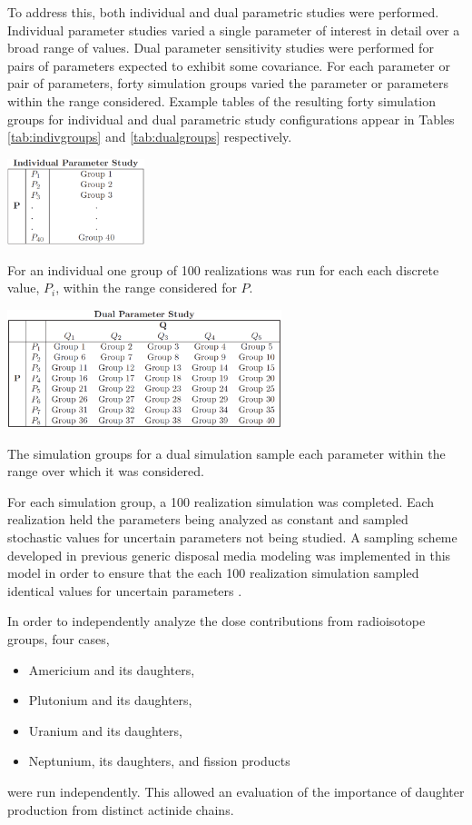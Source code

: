 To address this, both individual and dual parametric studies were performed. 
Individual parameter studies varied a single parameter of interest in 
detail over a broad range of values. Dual parameter sensitivity studies were 
performed for pairs of parameters expected to exhibit some covariance. For 
each parameter or pair of parameters, forty simulation 
groups varied the parameter or parameters within the range considered. Example 
tables of the resulting forty simulation groups for  individual 
and dual parametric study configurations appear in Tables \ref{tab:indivgroups} 
and \ref{tab:dualgroups} respectively.

\begin{table}[h!]
\centering
\includegraphics[width=0.3\textwidth]{./chapters/nuclide_sensitivity/indiv_groups.eps}
\caption{For an individual one group of 100 realizations was run for each 
each discrete value, $P_{i}$, within the range considered for $P$.}
\label{tab:indivgroups}
\end{table}

\begin{table}[h!]
\centering
\includegraphics[width=0.6\textwidth]{./chapters/nuclide_sensitivity/dual_groups.eps}
\caption{The simulation groups for a dual simulation sample each parameter 
within the range over which it was considered.}
\label{tab:dualgroups}
\end{table}

For each simulation group, a 100 realization simulation was completed. Each
realization held the parameters being analyzed as constant and sampled 
stochastic values for uncertain parameters not being studied.  A sampling scheme 
developed in previous generic disposal media modeling was implemented in this 
model in order to ensure that the each 100 realization simulation sampled 
identical values for uncertain parameters \cite{clayton_generic_2011, 
nutt_generic_2009}.  

In order to independently analyze the dose contributions from radioisotope 
groups, four cases,

\begin{itemize}
  \item Americium and its daughters,
  \item Plutonium and its daughters,
  \item Uranium and its daughters,
  \item Neptunium, its daughters, and fission products
\end{itemize}

were run independently. This allowed an evaluation of the importance of daughter 
production from distinct actinide chains. 
